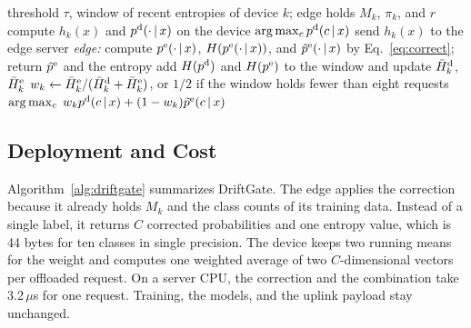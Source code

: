 \begin{algorithm}[t]
\caption{DriftGate inference for a request $x$ of device $k$}
\label{alg:driftgate}
\begin{algorithmic}[1]
\REQUIRE threshold $\tau$, window of recent entropies of device $k$; edge holds $M_k$, $\pi_k$, and $r$
\STATE compute $h_k(x)$ and $p^{\mathrm{d}}(\cdot\,|\,x)$ on the device
  \RETURN $\arg\max_c p^{\mathrm{d}}(c\,|\,x)$
\ENDIF
\STATE send $h_k(x)$ to the edge server
\STATE \textit{edge:} compute $p^{\mathrm{e}}(\cdot\,|\,x)$, $H(p^{\mathrm{e}}(\cdot\,|\,x))$, and $\tilde p^{\mathrm{e}}(\cdot\,|\,x)$ by Eq.~\eqref{eq:correct}; return $\tilde p^{\mathrm{e}}$ and the entropy
\STATE add $H(p^{\mathrm{d}})$ and $H(p^{\mathrm{e}})$ to the window and update $\bar H^{\mathrm{d}}_k$, $\bar H^{\mathrm{e}}_k$
\STATE $w_k\leftarrow \bar H^{\mathrm{e}}_k/(\bar H^{\mathrm{d}}_k+\bar H^{\mathrm{e}}_k)$, or $1/2$ if the window holds fewer than eight requests
\RETURN $\arg\max_c\; w_kp^{\mathrm{d}}(c\,|\,x)+(1-w_k)\tilde p^{\mathrm{e}}(c\,|\,x)$
\end{algorithmic}
\end{algorithm}

\subsection{Deployment and Cost}
\label{sec:cost}

Algorithm~\ref{alg:driftgate} summarizes DriftGate. The edge applies the correction because it already holds $M_k$ and the class counts of its training data. Instead of a single label, it returns $C$ corrected probabilities and one entropy value, which is 44 bytes for ten classes in single precision. The device keeps two running means for the weight and computes one weighted average of two $C$-dimensional vectors per offloaded request. On a server CPU, the correction and the combination take 3.2\,$\mu$s for one request. Training, the models, and the uplink payload stay unchanged.
